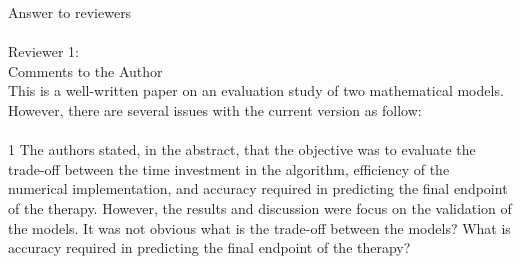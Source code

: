 \documentclass[letterpaper,12pt]{report}
\begin{document}
Answer to reviewers\\
\\
Reviewer 1:\\
Comments to the Author\\
This is a well-written paper on an evaluation study of
two mathematical models. However, there are several issues with the current version as follow:\\
\\
1	The authors stated, in the abstract, that the objective
was to evaluate the trade-off between the
time investment in the algorithm, efficiency of the numerical
implementation, and accuracy required in
predicting the final endpoint of the therapy. However,
the results and discussion were focus on the validation
of the models. It was not obvious what is the trade-off
between the models? What is accuracy required in
predicting the final endpoint of the therapy?
\end{document}
